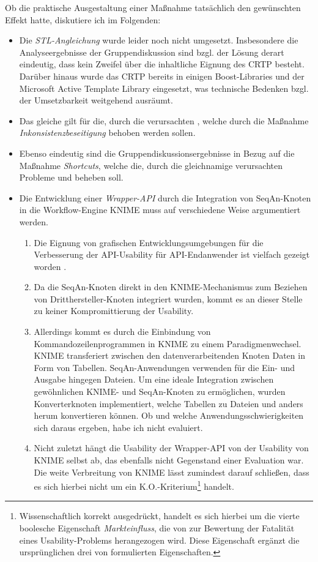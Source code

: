Ob die praktische Ausgestaltung einer Maßnahme tatsächlich den gewünschten Effekt hatte, diskutiere ich im Folgenden:
\begin{itemize}
  \item Die \textit{STL-Angleichung} wurde leider noch nicht umgesetzt. Insbesondere die Analyseergebnisse der Gruppendiskussion sind  bzgl. der Lösung derart eindeutig, dass kein Zweifel über die inhaltliche Eignung des CRTP besteht. Darüber hinaus wurde das CRTP bereits in einigen Boost-Libraries und der Microsoft Active Template Library eingesetzt, was technische Bedenken bzgl. der Umsetzbarkeit weitgehend ausräumt.
  \item Das gleiche gilt für die, durch die   verursachten , welche durch die Maßnahme \textit{Inkonsistenzbeseitigung} behoben werden sollen.
  \item Ebenso eindeutig sind die Gruppendiskussionsergebnisse in Bezug auf die Maßnahme \textit{Shortcuts}, welche die, durch die gleichnamige  verursachten Probleme  und  beheben soll.
  \item Die Entwicklung einer \textit{Wrapper-API} durch die Integration von SeqAn-Knoten in die Workflow-Engine KNIME muss auf verschiedene Weise argumentiert werden.
  \begin{enumerate}
    \item Die Eignung von grafischen Entwicklungsumgebungen für die Verbesserung der API-Usability für API-Endanwender ist vielfach gezeigt worden \citep{Ko:2011el}.
    \item Da die SeqAn-Knoten direkt in den KNIME-Mechanismus zum Beziehen von Dritthersteller-Knoten integriert wurden, kommt es an dieser Stelle zu keiner Kompromittierung der Usability.
    \item Allerdings kommt es durch die Einbindung von Kommandozeilenprogrammen in KNIME zu einem Paradigmenwechsel. KNIME transferiert zwischen den datenverarbeitenden Knoten Daten in Form von Tabellen. SeqAn-Anwendungen verwenden für die Ein- und Ausgabe hingegen Dateien. Um eine ideale Integration zwischen gewöhnlichen KNIME- und SeqAn-Knoten zu ermöglichen, wurden Konverterknoten implementiert, welche Tabellen zu Dateien und anders herum konvertieren können. Ob und welche Anwendungsschwierigkeiten sich daraus ergeben, habe ich nicht evaluiert.
    \item Nicht zuletzt hängt die Usability der Wrapper-API von der Usability von KNIME selbst ab, das ebenfalls nicht Gegenstand einer Evaluation war. Die weite Verbreitung von KNIME lässt zumindest darauf schließen, dass es sich hierbei nicht um ein K.O.-Kriterium\footnote{Wissenschaftlich korrekt ausgedrückt, handelt es sich hierbei um die vierte boolesche Eigenschaft \textit{Markteinfluss}, die von \cite{Sarodnick:2006vc} zur Bewertung der Fatalität eines Usability-Problems herangezogen wird. Diese Eigenschaft ergänzt die ursprünglichen drei von \cite{Nielsen:1994tx} formulierten Eigenschaften.} handelt.

\end{enumerate}
\end{itemize}
